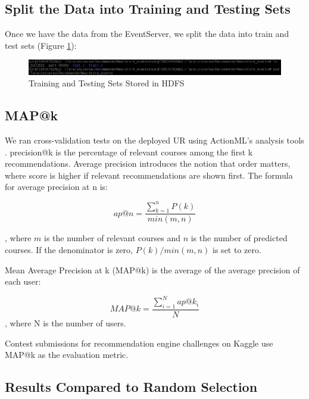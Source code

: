 \documentclass[12pt,journal]{IEEEtran}
\begin{document}
\subsection{Split the Data into Training and Testing Sets}
Once we have the data from the EventServer, we split the data into train and test sets (Figure \ref{fig:gottraintestsplitfiles}):

\begin{figure}[htbp]
\begin{center}
\includegraphics[width=1\columnwidth]{gottraintestsplitfiles}
\end{center}
\caption{Training and Testing Sets Stored in HDFS}
\label{fig:gottraintestsplitfiles}
\end{figure}

\subsection{MAP@k}

We ran cross-validation tests on the deployed UR using ActionML's analysis tools \cite{ActionMLAdvancedTuning}.  precision@k is the percentage of relevant courses among the first k recommendations.  Average precision introduces the notion that order matters, where score is higher if relevant recommendations are shown first.  The formula for average precision at n is:

\begin{equation}
ap@n = \frac{\sum_{k=1}^n P(k)}{min(m,n)} \!
\end{equation}

, where $m$ is the number of relevant courses and $n$ is the number of predicted courses.  If the denominator is zero, $P(k)/min(m,n)$ is set to zero. \cite{kaggleMAP}

Mean Average Precision at k (MAP@k) is the average of the average precision of each user:

\begin{equation}
MAP@k=\frac{\sum_{i=1}^N ap@k_i}{N}
\end{equation}
, where N is the number of users.

Contest submissions for recommendation engine challenges on Kaggle use MAP@k as the evaluation metric.

\subsection{Results Compared to Random Selection}
\end{document}
